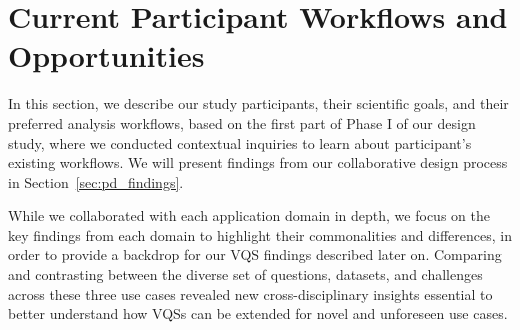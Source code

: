  \section{Current Participant Workflows and Opportunities\label{sec:participantdatasets}}
 In this section, we describe our study participants, their scientific goals, and their preferred analysis workflows, based on the first part of Phase I of our design study, where we conducted contextual inquiries to learn about participant's existing workflows. We will present findings from our collaborative design process in Section~\ref{sec:pd_findings}.%
 
 While we collaborated with each application domain in depth, we focus on the key findings from each domain to highlight their commonalities and differences, in order to provide a backdrop for our VQS findings described later on. Comparing and contrasting between the diverse set of questions, datasets, and challenges across these three use cases revealed new cross-disciplinary insights essential to better understand how VQSs can be extended for novel and unforeseen use cases.
